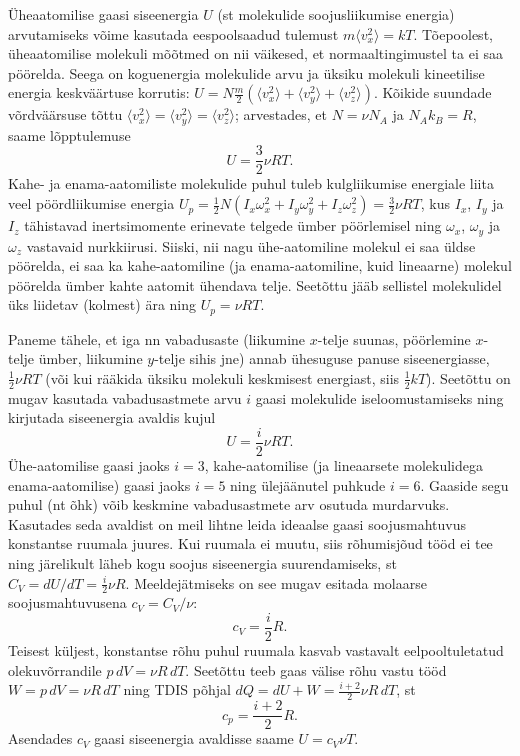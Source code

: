 \documentclass[a4paper,11pt,twocolumn]{article}
\begin{document}
Üheaatomilise gaasi siseenergia \( U \) (st molekulide soojusliikumise energia) arvutamiseks võime kasutada eespoolsaadud tulemust \( m\langle v^2_x\rangle = kT \). Tõepoolest, üheaatomilise molekuli mõõtmed on nii väikesed, et normaaltingimustel ta ei saa pöörelda. Seega on koguenergia molekulide arvu ja üksiku molekuli kineetilise energia keskväärtuse korrutis: \( U=N\frac{m}{2} (\langle v^2_x\rangle + \langle v^2_y\rangle + \langle v^2_z\rangle).\) Kõikide suundade võrdväärsuse tõttu \( \langle v^2_x\rangle = \langle v^2_y\rangle = \langle v^2_z\rangle \); arvestades, et \( N=\nu N_A \) ja \( N_A k_B=R \), saame lõpptulemuse
\[ U=\frac{3}{2} \nu RT.\]
Kahe- ja enama-aatomiliste molekulide puhul tuleb kulgliikumise energiale liita veel pöördliikumise energia \( U_p =\frac{1}{2} N(I_x\omega_x^2 + I_y\omega_y^2 + I_z\omega_z^2)=\frac{3}{2} \nu RT \), kus \( I_x \), \( I_y \) ja \( I_z \) tähistavad inertsimomente erinevate telgede ümber pöörlemisel ning \( \omega_x \), \( \omega_y \) ja \( \omega_z \) vastavaid nurkkiirusi. Siiski, nii nagu ühe-aatomiline molekul ei saa üldse pöörelda, ei saa ka kahe-aatomiline (ja enama-aatomiline, kuid lineaarne) molekul pöörelda ümber kahte aatomit ühendava telje. Seetõttu jääb sellistel molekulidel üks liidetav (kolmest) ära ning \( U_p=\nu RT .\) 

Paneme tähele, et iga nn vabadusaste (liikumine \( x \)-telje suunas, pöörlemine \( x \)-telje ümber, liikumine \( y \)-telje sihis jne) annab ühesuguse panuse siseenergiasse, \( \frac{1}{2}\nu RT \) (või kui rääkida üksiku molekuli keskmisest energiast, siis \( \frac{1}{2}kT \)). Seetõttu on mugav kasutada vabadusastmete arvu \( i \) gaasi molekulide iseloomustamiseks ning kirjutada siseenergia avaldis kujul
\[ U=\frac{i}{2} \nu RT.\]
Ühe-aatomilise gaasi jaoks \( i = 3 \), kahe-aatomilise (ja lineaarsete molekulidega enama-aatomilise) gaasi jaoks \( i = 5 \) ning ülejäänutel puhkude \( i = 6 \). Gaaside segu puhul (nt õhk) võib keskmine vabadusastmete arv osutuda murdarvuks. Kasutades seda avaldist on meil lihtne leida ideaalse gaasi soojusmahtuvus konstantse ruumala juures. Kui ruumala ei muutu, siis rõhumisjõud tööd ei tee ning järelikult läheb kogu soojus siseenergia suurendamiseks, st \( C_V = dU/dT = \frac{i}{2} \nu R \). Meeldejätmiseks on see mugav esitada molaarse soojusmahtuvusena \( c_V = C_V /\nu \):
\[ c_V = \frac{i}{2} R. \]
Teisest küljest, konstantse rõhu puhul ruumala kasvab vastavalt eelpooltuletatud olekuvõrrandile \( p\, dV = νR\, dT \). Seetõttu
teeb gaas välise rõhu vastu tööd \( W = p\, dV = \nu R\, dT \) ning TDIS
põhjal \( dQ = dU + W = \frac{i+2}{2} \nu R\, dT \), st
\[ c_p=\frac{i+2}{2}R.\]
Asendades \( c_V \) gaasi siseenergia avaldisse saame \( U=c_V \nu T \).
\end{document}
